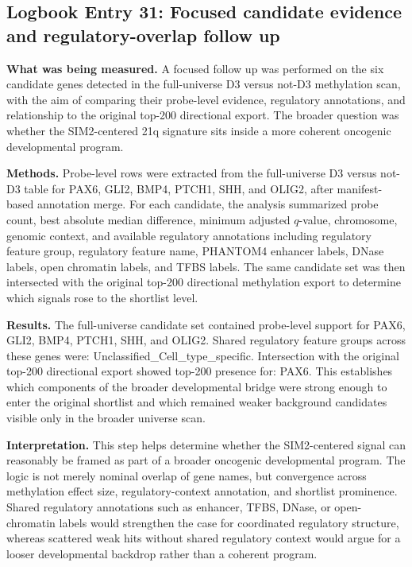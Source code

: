 \subsection*{Logbook Entry 31: Focused candidate evidence and regulatory-overlap follow up}

\textbf{What was being measured.}
A focused follow up was performed on the six candidate genes detected in the full-universe D3 versus not-D3 methylation scan, with the aim of comparing their probe-level evidence, regulatory annotations, and relationship to the original top-200 directional export. The broader question was whether the SIM2-centered 21q signature sits inside a more coherent oncogenic developmental program.

\textbf{Methods.}
Probe-level rows were extracted from the full-universe D3 versus not-D3 table for PAX6, GLI2, BMP4, PTCH1, SHH, and OLIG2, after manifest-based annotation merge. For each candidate, the analysis summarized probe count, best absolute median difference, minimum adjusted \(q\)-value, chromosome, genomic context, and available regulatory annotations including regulatory feature group, regulatory feature name, PHANTOM4 enhancer labels, DNase labels, open chromatin labels, and TFBS labels. The same candidate set was then intersected with the original top-200 directional methylation export to determine which signals rose to the shortlist level.

\textbf{Results.}
The full-universe candidate set contained probe-level support for PAX6, GLI2, BMP4, PTCH1, SHH, and OLIG2. Shared regulatory feature groups across these genes were: Unclassified\_Cell\_type\_specific. Intersection with the original top-200 directional export showed top-200 presence for: PAX6. This establishes which components of the broader developmental bridge were strong enough to enter the original shortlist and which remained weaker background candidates visible only in the broader universe scan.

\textbf{Interpretation.}
This step helps determine whether the SIM2-centered signal can reasonably be framed as part of a broader oncogenic developmental program. The logic is not merely nominal overlap of gene names, but convergence across methylation effect size, regulatory-context annotation, and shortlist prominence. Shared regulatory annotations such as enhancer, TFBS, DNase, or open-chromatin labels would strengthen the case for coordinated regulatory structure, whereas scattered weak hits without shared regulatory context would argue for a looser developmental backdrop rather than a coherent program.

